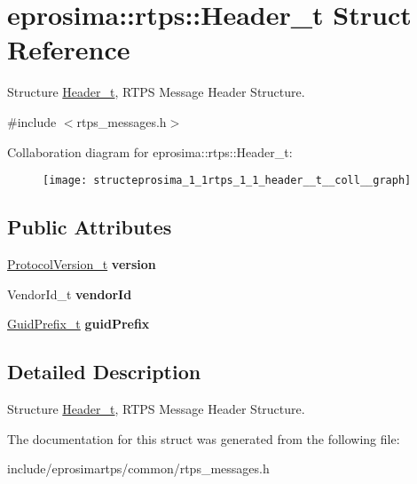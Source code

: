 \hypertarget{structeprosima_1_1rtps_1_1_header__t}{\section{eprosima\-:\-:rtps\-:\-:\-Header\-\_\-t \-Struct \-Reference}
\label{structeprosima_1_1rtps_1_1_header__t}
}


\-Structure \hyperlink{structeprosima_1_1rtps_1_1_header__t}{\-Header\-\_\-t}, \-R\-T\-P\-S \-Message \-Header \-Structure.  




{\ttfamily \#include $<$rtps\-\_\-messages.\-h$>$}



\-Collaboration diagram for eprosima\-:\-:rtps\-:\-:\-Header\-\_\-t\-:\nopagebreak
\begin{figure}[H]
\begin{center}
\leavevmode
\texttt{[image: structeprosima\_1\_1rtps\_1\_1\_header\_\_t\_\_coll\_\_graph]}
\end{center}
\end{figure}
\subsection*{\-Public \-Attributes}
\begin{DoxyCompactItemize}
\item 
\hypertarget{structeprosima_1_1rtps_1_1_header__t_a73389c003bee29d57d246e7bf2655ac4}{\hyperlink{structeprosima_1_1rtps_1_1_protocol_version__t}{\-Protocol\-Version\-\_\-t} {\bfseries version}}\label{structeprosima_1_1rtps_1_1_header__t_a73389c003bee29d57d246e7bf2655ac4}

\item 
\hypertarget{structeprosima_1_1rtps_1_1_header__t_a822e98809ab83f62f17f9f7679e6d0fb}{\-Vendor\-Id\-\_\-t {\bfseries vendor\-Id}}\label{structeprosima_1_1rtps_1_1_header__t_a822e98809ab83f62f17f9f7679e6d0fb}

\item 
\hypertarget{structeprosima_1_1rtps_1_1_header__t_aaaa5e458ba5d0164e61f3081bfa389d7}{\hyperlink{structeprosima_1_1rtps_1_1_guid_prefix__t}{\-Guid\-Prefix\-\_\-t} {\bfseries guid\-Prefix}}\label{structeprosima_1_1rtps_1_1_header__t_aaaa5e458ba5d0164e61f3081bfa389d7}

\end{DoxyCompactItemize}


\subsection{\-Detailed \-Description}
\-Structure \hyperlink{structeprosima_1_1rtps_1_1_header__t}{\-Header\-\_\-t}, \-R\-T\-P\-S \-Message \-Header \-Structure. 

\-The documentation for this struct was generated from the following file\-:\begin{DoxyCompactItemize}
\item 
include/eprosimartps/common/rtps\-\_\-messages.\-h\end{DoxyCompactItemize}
